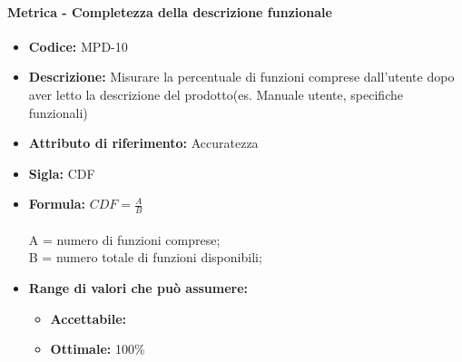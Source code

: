                   \paragraph{Metrica - Completezza della descrizione funzionale} 
            \begin{itemize}
           \item   \textbf{Codice:} MPD-10
           \item   \textbf{Descrizione:} Misurare la percentuale di funzioni comprese dall'utente dopo aver letto la descrizione del prodotto(es. Manuale utente, specifiche funzionali) 
           \item    \textbf{Attributo di riferimento:} Accuratezza
           \item   \textbf{Sigla:} CDF
           \item   \textbf{Formula:} \begin{math}CDF = \frac{A}{B}\end{math}\\ \\
            A = numero di funzioni comprese;\\
            B = numero totale di funzioni disponibili;
            \item \textbf{Range di valori che può assumere:}
        \begin{itemize}
            \item \textbf{Accettabile:} 
            \item \textbf{Ottimale:} 100\%
        \end{itemize}
       \end{itemize}
       
